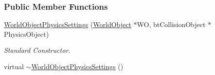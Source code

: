 \subsubsection*{Public Member Functions}
\begin{DoxyCompactItemize}
\item 
\hyperlink{classMezzanine_1_1WorldObjectPhysicsSettings_affb46355a699ca229f906dda739bc5da}{WorldObjectPhysicsSettings} (\hyperlink{classMezzanine_1_1WorldObject}{WorldObject} $\ast$WO, btCollisionObject $\ast$PhysicsObject)
\begin{DoxyCompactList}\small\item\em Standard Constructor. \item\end{DoxyCompactList}\item 
\hypertarget{classMezzanine_1_1WorldObjectPhysicsSettings_a19b8556f7dedb40ac4b987fb5d0c02d8}{
virtual \hyperlink{classMezzanine_1_1WorldObjectPhysicsSettings_a19b8556f7dedb40ac4b987fb5d0c02d8}{$\sim$WorldObjectPhysicsSettings} ()}
\label{classMezzanine_1_1WorldObjectPhysicsSettings_a19b8556f7dedb40ac4b987fb5d0c02d8}


\end{DoxyCompactItemize}
